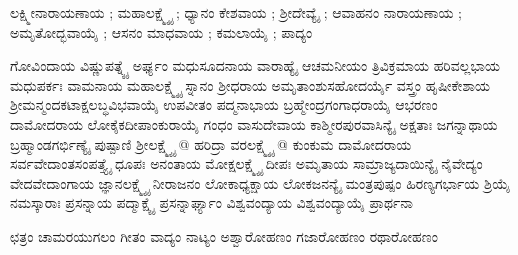 ಲಕ್ಷ್ಮೀನಾರಾಯಣಾಯ ; ಮಹಾಲಕ್ಷ್ಮ್ಯೈ ; ಧ್ಯಾನಂ
ಕೇಶವಾಯ ; ಶ್ರೀದೇವ್ಯೈ ; ಆವಾಹನಂ
ನಾರಾಯಣಾಯ ; ಅಮೃತೋದ್ಭವಾಯೈ ; ಆಸನಂ
ಮಾಧವಾಯ ; ಕಮಲಾಯೈ ; ಪಾದ್ಯಂ

ಗೋವಿಂದಾಯ ವಿಷ್ಣುಪತ್ನ್ಯೈ ಅರ್ಘ್ಯಂ
ಮಧುಸೂದನಾಯ ವಾರಾಹ್ಯೈ ಆಚಮನೀಯಂ
ತ್ರಿವಿಕ್ರಮಾಯ ಹರಿವಲ್ಲಭಾಯ ಮಧುಪರ್ಕಃ
ವಾಮನಾಯ ಮಹಾಲಕ್ಷ್ಮ್ಯೈ ಸ್ನಾನಂ
ಶ್ರೀಧರಾಯ ಅಮೃತಾಂಶುಸಹೋದರ್ಯೈ ವಸ್ತ್ರಂ
ಹೃಷೀಕೇಶಾಯ ಶ್ರೀಮನ್ಮಂದಕಟಾಕ್ಷಲಬ್ಧವಿಭವಾಯೈ ಉಪವೀತಂ
ಪದ್ಮನಾಭಾಯ ಬ್ರಹ್ಮೇಂದ್ರಗಂಗಾಧರಾಯೈ ಆಭರಣಂ
ದಾಮೋದರಾಯ ಲೋಕೈಕದೀಪಾಂಕುರಾಯೈ ಗಂಧಂ
ವಾಸುದೇವಾಯ ಕಾಶ್ಮೀರಪುರವಾಸಿನ್ಯೈ ಅಕ್ಷತಾಃ
ಜಗನ್ನಾಥಾಯ ಬ್ರಹ್ಮಾಂಡಗರ್ಭಿಣ್ಯೈ ಪುಷ್ಪಾಣಿ
ಶ್ರೀಲಕ್ಷ್ಮ್ಯೈ @  ಹರಿದ್ರಾ
ವರಲಕ್ಷ್ಮ್ಯೈ @ ಕುಂಕುಮ
ದಾಮೋದರಾಯ ಸರ್ವವೇದಾಂತಸಂಪತ್ತ್ಯೈ ಧೂಪಃ
ಅನಂತಾಯ ಮೋಕ್ಷಲಕ್ಷ್ಮ್ಯೈ ದೀಪಃ
ಅಮೃತಾಯ ಸಾಮ್ರಾಜ್ಯದಾಯಿನ್ಯೈ ನೈವೇದ್ಯಂ
ವೇದವೇದಾಂಗಾಯ ಜ್ಞಾನಲಕ್ಷ್ಮ್ಯೈ ನೀರಾಜನಂ
ಲೋಕಾಧ್ಯಕ್ಷಾಯ ಲೋಕಜನನ್ಯೈ ಮಂತ್ರಪುಷ್ಪಂ
ಹಿರಣ್ಯಗರ್ಭಾಯ ಶ್ರಿಯೈ ನಮಸ್ಕಾರಾಃ
ಪ್ರಸನ್ನಾಯ ಪದ್ಮಾಕ್ಷ್ಯೈ ಪ್ರಸನ್ನಾರ್ಘ್ಯಾಂ
ವಿಶ್ವವಂದ್ಯಾಯ ವಿಶ್ವವಂದ್ಯಾಯೈ ಪ್ರಾರ್ಥನಾ

ಛತ್ರಂ ಚಾಮರಯುಗಲಂ ಗೀತಂ ವಾದ್ಯಂ ನಾಟ್ಯಂ ಅಶ್ವಾರೋಹಣಂ ಗಜಾರೋಹಣಂ ರಥಾರೋಹಣಂ


 
 
